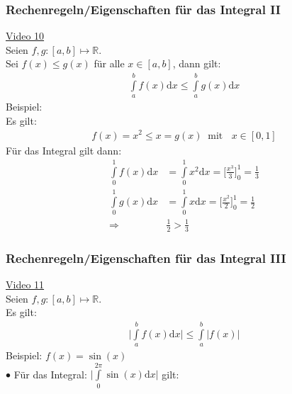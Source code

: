 \subsubsection{Rechenregeln/Eigenschaften für das Integral II }
\href{https://youtu.be/bCqPDYJzXw0}{Video 10}\\
Seien $ f,g:[a,b]\longmapsto \mathbb{R} $.\\
Sei $ f(x)\leq g(x) $ für alle $ x\in [a,b] $, dann gilt:\\
\begin{align*}
\int\limits_{a}^{b}f(x)\mathrm{d}x\leq\int\limits_{a}^{b} g(x)\mathrm{d}x 
\end{align*}
Beispiel:\\
Es gilt:\\
\begin{align*}
f(x)=x^2\leq x = g(x)\;\;\text{mit }\;\;x\in[0,1]
\end{align*}
Für das Integral gilt dann:\\
\begin{align*}
\int\limits_{0}^{1} f(x)\mathrm{d}x&=\int\limits_{0}^{1} x^2\mathrm{d}x=\bigg[\frac{x^3}{3}\bigg]^1_0=\frac{1}{3}\\
\int\limits_{0}^{1}g(x)\mathrm{d}x&=\int\limits_{0}^{1} x\mathrm{d}x=\bigg[\frac{x^2}{2}\bigg]^1_0=\frac{1}{2}\\
\Rightarrow&\frac{1}{2}>\frac{1}{3}
\end{align*}
\newpage
\subsubsection{Rechenregeln/Eigenschaften für das Integral III }
\href{https://youtu.be/3EPUbiOtG2g}{Video 11}\\
Seien $ f,g:[a,b]\longmapsto \mathbb{R} $.\\
Es gilt:\\
\begin{align*}
\bigg|\int\limits_{a}^{b} f(x)\mathrm{d}x\bigg|\leq \int\limits_{a}^{b}\big|f(x)\big| 
\end{align*}
Beispiel: $ f(x)=\sin(x) $\\

$\bullet$ Für das Integral: $ \bigg|\int\limits_{0}^{2\pi} \sin(x)\mathrm{d}x\bigg| $ gilt:\\

